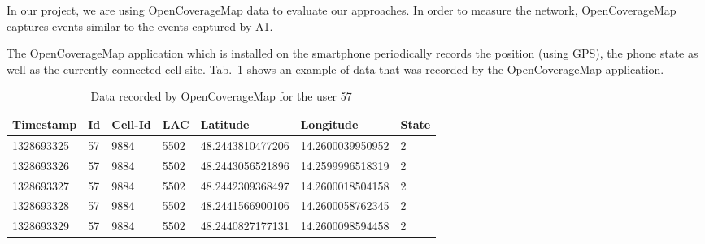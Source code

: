 \documentclass[master,english]{hgbthesis}
\begin{document}
In our project, we are using OpenCoverageMap data to evaluate our approaches. In order to measure the network, OpenCoverageMap captures events similar to the events captured by A1.







The OpenCoverageMap application which is installed on the smartphone periodically records the position (using GPS), the phone state as well as the currently connected cell site. Tab.\ \ref{tab:ocmrecord} shows an example of data that was recorded by the OpenCoverageMap application.

\begin{table}

	\begin{tabular}{|l|l|l|l|l|l|l|}  \hline

		\textbf{Timestamp} & \textbf{Id} & \textbf{Cell-Id} & \textbf{LAC} & \textbf{Latitude} & \textbf{Longitude} & \textbf{State} \\    \hline 1328693325 & 57         & 9884   & 5502 & 48.2443810477206 & 14.2600039950952 & 2 \\  \hline

		1328693326 & 57         & 9884   & 5502 & 48.2443056521896 & 14.2599996518319 & 2\\  \hline

		1328693327 & 57         & 9884   & 5502 & 48.2442309368497 & 14.2600018504158 & 2\\  \hline

		1328693328 & 57         & 9884   & 5502 & 48.2441566900106 & 14.2600058762345 & 2\\  \hline

		1328693329 & 57         & 9884   & 5502 & 48.2440827177131 & 14.2600098594458 & 2\\  \hline

	\end{tabular}

	\caption{Data recorded by OpenCoverageMap for the user 57}

	\label{tab:ocmrecord}

\end{table}
\end{document}
